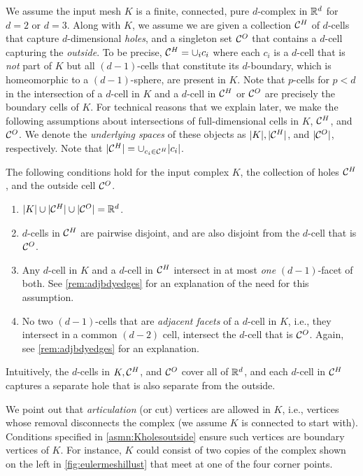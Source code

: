 We assume the input mesh $K$ is a finite, connected, pure $d$-complex in ${\mathbb R}^d$ for $d=2$ or $d=3$.
Along with $K$, we assume we are given a collection $\mathcal{C}^H$ of $d$-cells that capture $d$-dimensional \emph{holes}, and a singleton set $\mathcal{C}^O$ that contains a $d$-cell capturing the \emph{outside}.
To be precise, $\mathcal{C}^H = \cup_i c_i$ where each $c_i$ is a $d$-cell that is \emph{not} part of $K$ but all $(d-1)$-cells that constitute its $d$-boundary, which is homeomorphic to a $(d-1)$-sphere, are present in $K$.
Note that $p$-cells for $p < d$ in the intersection of a $d$-cell in $K$ and a $d$-cell in $\mathcal{C}^H$ or $\mathcal{C}^O$ are precisely the boundary cells of $K$.
For technical reasons that we explain later, we make the following assumptions about intersections of full-dimensional cells in $K$, $\mathcal{C}^H$, and $\mathcal{C}^O$.
We denote the \emph{underlying spaces} of these objects as $|K|, |\mathcal{C}^H|$, and $|\mathcal{C}^O|$, respectively.
Note that $|\mathcal{C}^H| = \cup_{c_i \in \mathcal{C}^H} |c_i|$.

\begin{asmn} \label{asmn:Kholesoutside}
  The following conditions hold for the input complex $K$, the collection of holes $\mathcal{C}^H$, and the outside cell $\mathcal{C}^O$.
  \begin{enumerate}
    \item $|K| \cup |\mathcal{C}^H| \cup |\mathcal{C}^O| = {\mathbb R}^d$.
    \item \label{asmn:sepholes} $d$-cells in $\mathcal{C}^H$ are pairwise disjoint, and are also disjoint from the $d$-cell that is $\mathcal{C}^O$. 
    \item \label{asmn:holeintr} Any $d$-cell in $K$ and a $d$-cell in $\mathcal{C}^H$ intersect in at most \emph{one} $(d-1)$-facet of both. See \cref{rem:adjbdyedges} for an explanation of the need for this assumption.
    \item  \label{asmn:outintr} No two $(d-1)$-cells that are \emph{adjacent facets} of a $d$-cell in $K$, i.e., they intersect in a common $(d-2)$ cell, intersect the $d$-cell that is $\mathcal{C}^O$. Again, see \cref{rem:adjbdyedges} for an explanation.
  \end{enumerate}
\end{asmn}
%
\noindent Intuitively, the $d$-cells in $K, \mathcal{C}^H$, and $\mathcal{C}^O$ cover all of ${\mathbb R}^d$, and each $d$-cell in $\mathcal{C}^H$ captures a separate hole that is also separate from the outside.

We point out that \emph{articulation} (or cut) vertices are allowed in $K$, i.e., vertices whose removal disconnects the complex (we assume $K$ is connected to start with).
Conditions specified in \cref{asmn:Kholesoutside} ensure such vertices are boundary vertices of $K$.
For instance, $K$ could consist of two copies of the complex shown on the left in \cref{fig:eulermeshillust} that meet at one of the four corner points.


